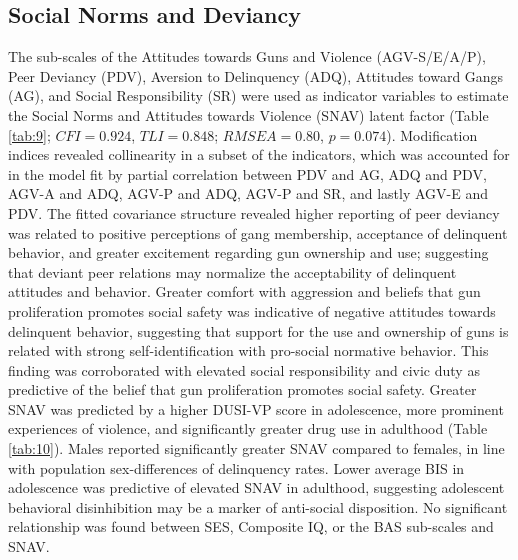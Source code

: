 \documentclass[utf8]{article}
\begin{document}
\subsection*{Social Norms and Deviancy} The sub-scales of the Attitudes towards Guns and Violence (AGV-S/E/A/P), Peer Deviancy (PDV), Aversion to Delinquency (ADQ), Attitudes toward Gangs (AG), and Social Responsibility (SR) were used as indicator variables to estimate the Social Norms and Attitudes towards Violence (SNAV) latent factor (Table \ref{tab:9}; $CFI=0.924$, $TLI=0.848$; $RMSEA=0.80$, $p=0.074$). Modification indices revealed collinearity in a subset of the indicators, which was accounted for in the model fit by partial correlation between PDV and AG, ADQ and PDV, AGV-A and ADQ, AGV-P and ADQ, AGV-P and SR, and lastly AGV-E and PDV. The fitted covariance structure revealed higher reporting of peer deviancy was related to positive perceptions of gang membership, acceptance of delinquent behavior, and greater excitement regarding gun ownership and use; suggesting that deviant peer relations may normalize the acceptability of delinquent attitudes and behavior. Greater comfort with aggression and beliefs that gun proliferation promotes social safety was indicative of negative attitudes towards delinquent behavior, suggesting that support for the use and ownership of guns is related with strong self-identification with pro-social normative behavior. This finding was corroborated with elevated social responsibility and civic duty as predictive of the belief that gun proliferation promotes social safety. Greater SNAV was predicted by a higher DUSI-VP score in adolescence, more prominent experiences of violence, and significantly greater drug use in adulthood (Table \ref{tab:10}). Males reported significantly greater SNAV compared to females, in line with population sex-differences of delinquency rates. Lower average BIS in adolescence was predictive of elevated SNAV in adulthood, suggesting adolescent behavioral disinhibition may be a marker of anti-social disposition. No significant relationship was found between SES, Composite IQ, or the BAS sub-scales and SNAV.
\end{document}
